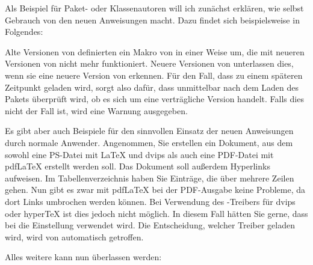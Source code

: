 \begin{Example}
  Als Beispiel für Paket- oder Klassenautoren will ich zunächst
  erklären, wie \KOMAScript{} selbst Gebrauch von den neuen
  Anweisungen macht. Dazu findet sich beispielsweise in 
  Folgendes:
\begin{lstcode}
\end{lstcode}
  Alte Versionen von  definierten ein Makro von
   in einer Weise um, die mit neueren Versionen
  von \KOMAScript{} nicht mehr funktioniert. Neuere Versionen von
   unterlassen dies, wenn sie eine neuere Version
  von \KOMAScript{} erkennen. Für den Fall, dass 
  zu einem späteren Zeitpunkt geladen wird, sorgt also 
  dafür, dass unmittelbar nach dem Laden des Pakets überprüft wird, ob
  es sich um eine verträgliche Version handelt. Falls dies nicht der
  Fall ist, wird eine Warnung ausgegeben.

  Es gibt aber auch Beispiele für den sinnvollen Einsatz der neuen
  Anweisungen durch normale Anwender. Angenommen, Sie erstellen ein
  Dokument, aus dem sowohl eine PS-Datei mit \LaTeX{} und dvips als auch
  eine PDF-Datei mit \mbox{pdf\LaTeX} erstellt werden soll. Das Dokument soll
  außerdem Hyperlinks aufweisen. Im Tabellenverzeichnis haben Sie
  Einträge, die über mehrere Zeilen gehen. Nun gibt es zwar mit
  \mbox{pdf\LaTeX} bei der PDF-Ausgabe keine Probleme, da dort Links
  umbrochen werden können. Bei Verwendung des
  -Treibers für dvips oder
  \mbox{hyper\TeX} ist dies jedoch nicht
  möglich. In diesem Fall hätten Sie gerne, dass bei
   die Einstellung  verwendet
  wird. Die Entscheidung, welcher Treiber geladen wird, wird von
   automatisch getroffen.

  Alles weitere kann nun  überlassen werden:
\end{Example}
